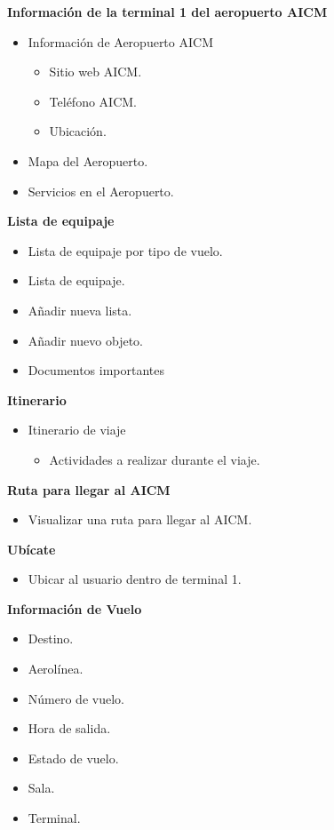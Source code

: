 \textbf{Información de la terminal 1 del aeropuerto AICM}

\begin{itemize}
	\item Información de Aeropuerto AICM
	\begin{itemize}
		 \item Sitio web AICM.
		\item Teléfono AICM.
		\item Ubicación.
	\end{itemize}
	\item Mapa del Aeropuerto.
	\item	Servicios en el Aeropuerto.
\end{itemize}

\textbf{Lista de equipaje}

\begin{itemize}
	\item 	Lista de equipaje por tipo de vuelo.
	\item Lista de equipaje.
	\item Añadir nueva lista.
	\item Añadir nuevo objeto.
	\item Documentos importantes
\end{itemize}
	
\textbf{Itinerario}

\begin{itemize}
	\item Itinerario de viaje
	\begin{itemize}
	 \item Actividades a realizar durante el viaje.
	\end{itemize}
\end{itemize}

\textbf{Ruta para llegar al AICM}

\begin{itemize}
	\item Visualizar una ruta para llegar al AICM.
\end{itemize}

\textbf{Ubícate}

\begin{itemize}
	\item Ubicar al usuario dentro de terminal 1.
\end{itemize} 

\textbf{Información de Vuelo}

\begin{itemize}
	\item Destino.
	\item Aerolínea.
	\item Número de vuelo.
	\item Hora de salida.
	\item Estado de vuelo.
	\item Sala.
	\item Terminal.
\end{itemize}

